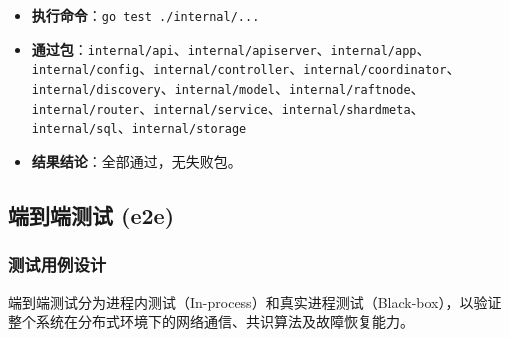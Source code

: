 \documentclass[UTF8,a4paper,12pt]{ctexart}
\begin{document}
\begin{tcolorbox}[
  enhanced,
  colback=GoogleGray,
  colframe=GoogleBlue,
  arc=6pt,
  boxrule=1pt,
  left=1em, right=1em, top=1em, bottom=1em,
  fontupper=\sffamily\small,
  title=\textbf{单元测试实际运行结果}
]
  \begin{itemize}[leftmargin=2em]
    \item \textbf{执行命令}：\texttt{go test ./internal/...}
    \item \textbf{通过包}：\texttt{internal/api}、\texttt{internal/apiserver}、\texttt{internal/app}、\texttt{internal/config}、\texttt{internal/controller}、\texttt{internal/coordinator}、\texttt{internal/discovery}、\texttt{internal/model}、\texttt{internal/raftnode}、\texttt{internal/router}、\texttt{internal/service}、\texttt{internal/shardmeta}、\texttt{internal/sql}、\texttt{internal/storage}
    \item \textbf{结果结论}：全部通过，无失败包。
  \end{itemize}
\end{tcolorbox}

\subsection{端到端测试 (e2e)}
\subsubsection{测试用例设计}
端到端测试分为进程内测试（In-process）和真实进程测试（Black-box），以验证整个系统在分布式环境下的网络通信、共识算法及故障恢复能力。
\end{document}
